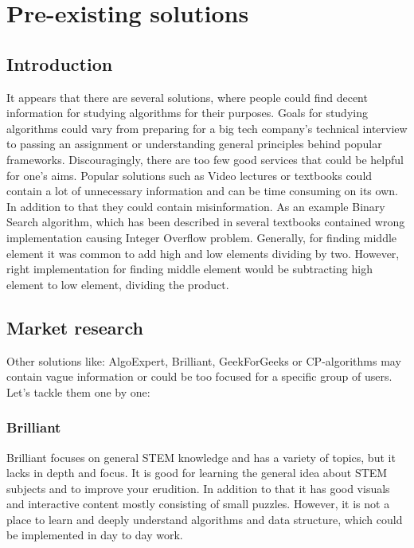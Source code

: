 \chapter{Pre-existing solutions }\label{ch:4}

\section{Introduction}

It appears that there are several solutions, where people could find decent information for studying algorithms for their purposes. Goals for studying algorithms could vary from preparing for a big tech company's technical interview to passing an assignment or understanding general principles behind popular frameworks. Discouragingly, there are too few good services that could be helpful for one's aims. Popular solutions such as Video lectures or textbooks could contain a lot of unnecessary information and can be time consuming on its own. In addition to that they could contain misinformation. As an example Binary Search algorithm, which has been described in several textbooks contained wrong implementation causing Integer Overflow problem. Generally, for finding middle element it was common to add high and low elements dividing by two. However, right implementation for finding middle element would be subtracting high element to low element, dividing the product. \\

\section{Market research}

Other solutions like: AlgoExpert, Brilliant, GeekForGeeks or CP-algorithms may contain vague information or could be too focused for a specific group of users.
Let's tackle them one by one:

\subsection{Brilliant}
Brilliant focuses on general STEM knowledge and has a variety of topics, but it lacks in depth and focus. It is good for learning the general idea about STEM subjects and to improve your erudition. In addition to that it has good visuals and interactive content mostly consisting of small puzzles. However, it is not a place to learn and deeply understand algorithms and data structure, which could be implemented in day to day work. \\

